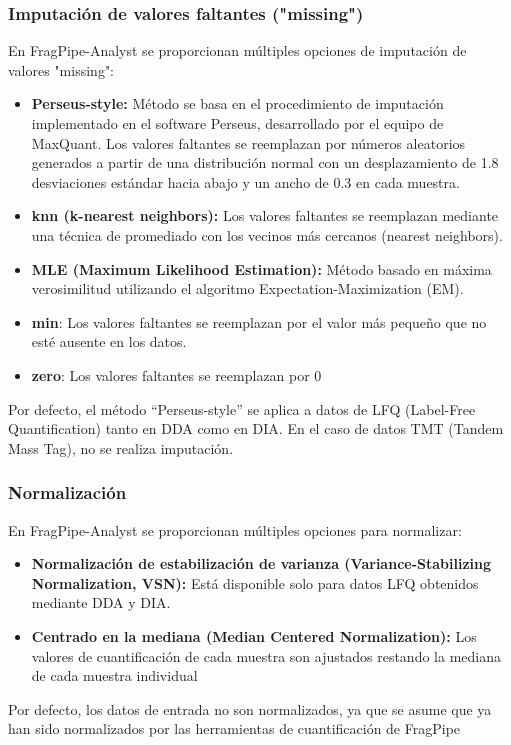 \documentclass[nochap]{config/ejercicios}
\begin{document}
\subsubsection{Imputación de valores faltantes ("missing")}
En FragPipe-Analyst se proporcionan múltiples opciones de imputación de valores "missing":
\begin{itemize}
\item \textbf{Perseus-style:} Método se basa en el procedimiento de imputación implementado en el software Perseus, desarrollado por el equipo de MaxQuant. Los valores faltantes se reemplazan por números aleatorios generados a partir de una distribución normal con un desplazamiento de 1.8 desviaciones estándar hacia abajo y un ancho de 0.3 en cada muestra.
\item \textbf{knn (k-nearest neighbors):} Los valores faltantes se reemplazan mediante una técnica de promediado con los vecinos más cercanos (nearest neighbors).
\item \textbf{MLE (Maximum Likelihood Estimation):} Método basado en máxima verosimilitud utilizando el algoritmo Expectation-Maximization (EM).
\item \textbf{min}: Los valores faltantes se reemplazan por el valor más pequeño que no esté ausente en los datos.
\item \textbf{zero}: Los valores faltantes se reemplazan por 0
\end{itemize}

Por defecto, el método “Perseus-style” se aplica a datos de LFQ (Label-Free Quantification) tanto
en DDA como en DIA. En el caso de datos TMT (Tandem Mass Tag), no se realiza imputación.

\subsubsection{Normalización}
En FragPipe-Analyst se proporcionan múltiples opciones para normalizar:
\begin{itemize}
\item \textbf{Normalización de estabilización de varianza (Variance-Stabilizing Normalization, VSN):} Está disponible solo para datos LFQ obtenidos mediante DDA y DIA. 
\item \textbf{Centrado en la mediana (Median Centered Normalization):} Los valores de cuantificación de cada muestra son ajustados restando la mediana de cada muestra individual
\end{itemize}

Por defecto, los datos de entrada no son normalizados, ya que se asume que ya han sido
normalizados por las herramientas de cuantificación de FragPipe
\end{document}
